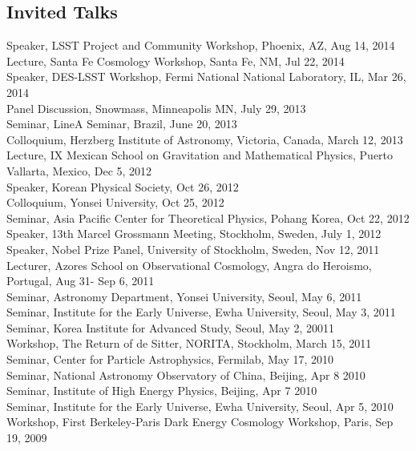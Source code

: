 \documentclass[line, margin]{res}
\begin{document}
\begin{resume}
\section{Invited Talks}
Speaker, LSST Project and Community Workshop, Phoenix, AZ, Aug 14, 2014\\
Lecture, Santa Fe Cosmology Workshop, Santa Fe, NM, Jul 22, 2014\\
Speaker, DES-LSST Workshop, Fermi National National Laboratory, IL, Mar 26, 2014\\
Panel Discussion, Snowmass, Minneapolis MN, July 29, 2013\\
Seminar, LineA Seminar, Brazil, June 20, 2013\\
Colloquium, Herzberg Institute of Astronomy, Victoria, Canada, March 12, 2013\\
Lecture, IX Mexican School on Gravitation and Mathematical Physics, Puerto Vallarta, Mexico, Dec 5, 2012\\
Speaker, Korean Physical Society, Oct 26, 2012\\
Colloquium, Yonsei University, Oct 25, 2012\\
Seminar, Asia Pacific Center for Theoretical Physics, Pohang Korea, Oct 22, 2012\\
Speaker, 13th Marcel Grossmann Meeting, Stockholm, Sweden, July 1, 2012\\ 
Speaker, Nobel Prize Panel, University of Stockholm, Sweden, Nov 12, 2011\\
Lecturer, Azores School on Observational Cosmology, Angra do Heroismo, Portugal, Aug 31- Sep 6, 2011\\
Seminar, Astronomy Department, Yonsei University, Seoul, May 6, 2011\\
Seminar, Institute for the Early Universe, Ewha University, Seoul, May 3, 2011\\
Seminar, Korea Institute for Advanced Study, Seoul, May 2, 20011\\
Workshop, The Return of de Sitter, NORITA, Stockholm, March 15, 2011\\
Seminar, Center for Particle Astrophysics, Fermilab, May 17, 2010\\
Seminar, National Astronomy Observatory of China, Beijing, Apr 8 2010\\
Seminar, Institute of High Energy Physics, Beijing, Apr 7 2010\\
Seminar, Institute for the Early Universe, Ewha University, Seoul, Apr 5, 2010\\
Workshop, First Berkeley-Paris Dark Energy Cosmology Workshop, Paris, Sep 19, 2009\\

\end{resume}
\end{document}
